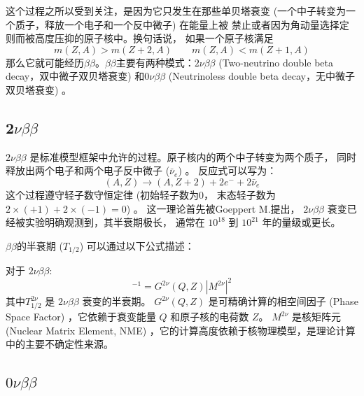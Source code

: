这个过程之所以受到关注，是因为它只发生在那些单贝塔衰变
 (一个中子转变为一个质子，释放一个电子和一个反中微子) 在能量上被
禁止或者因为角动量选择定则而被高度压抑的原子核中。换句话说，
如果一个原子核满足
\begin{equation}
    m (Z, A)  > m (Z+2, A)  \quad \quad m (Z,A)  < m (Z+1, A) 
\end{equation}    
那么它就可能经历$\beta\beta$。$\beta\beta$主要有两种模式：$2\nu\beta\beta$  (Two-neutrino double beta decay，双中微子双贝塔衰变) 
和$0\nu\beta\beta$  (Neutrinoless double beta decay，无中微子双贝塔衰变) 。

\subsection{2$\nu\beta\beta$}

    $2\nu\beta\beta$ 是标准模型框架中允许的过程。原子核内的两个中子转变为两个质子，
    同时释放出两个电子和两个电子反中微子  ($\bar{\nu}_e$) 。
    反应式可以写为：
    \begin{equation}
         (A, Z)  \rightarrow  (A, Z+2)  + 2e^{-} + 2\bar{\nu}_e
    \end{equation}
    这个过程遵守轻子数守恒定律 (初始轻子数为0，
    末态轻子数为 $2 \times  (+1)  + 2 \times  (-1)  = 0$) 。
    这一理论首先被Goeppert M.提出\cite{PhysRev.48.512}，
    $2\nu\beta\beta$ 衰变已经被实验明确观测到，其半衰期极长，
    通常在 $10^{18}$ 到 $10^{21}$ 年的量级或更长\cite{ParticleDataGroup:2024cfk}。

    
$\beta\beta$的半衰期  ($T_{1/2}$)  可以通过以下公式描述：

对于 $2\nu\beta\beta$:
    \begin{equation}
        [ T^{2\nu}_{1/2} ]^{-1} = G^{2\nu} (Q, Z)  | M^{2\nu} |^2
    \end{equation}
    其中$T^{2\nu}_{1/2}$ 是 $2\nu\beta\beta$ 衰变的半衰期。
    $G^{2\nu} (Q, Z) $ 是可精确计算的相空间因子 (Phase Space Factor) ，它依赖于衰变能量 $Q$ 和原子核的电荷数 $Z$。
    $M^{2\nu}$ 是核矩阵元 (Nuclear Matrix Element, NME) ，它的计算高度依赖于核物理模型，是理论计算中的主要不确定性来源。



\subsection{$0\nu\beta\beta$}

